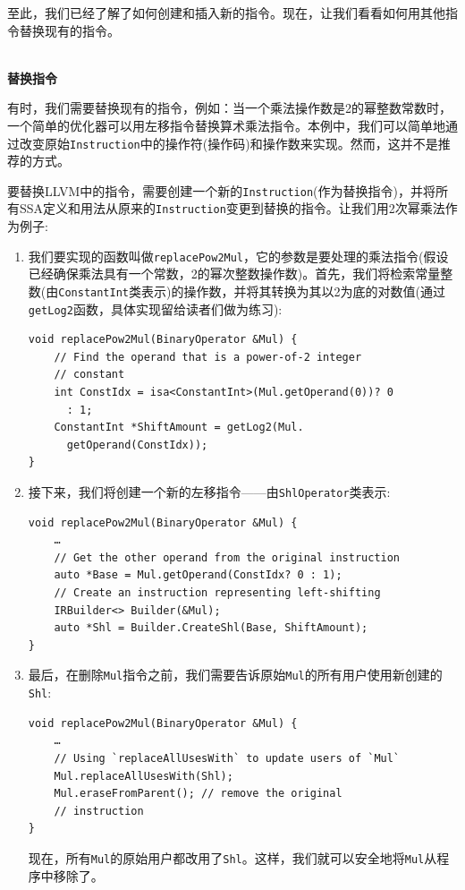 至此，我们已经了解了如何创建和插入新的指令。现在，让我们看看如何用其他指令替换现有的指令。

\hspace*{\fill} \\ %
\noindent
\textbf{替换指令}

有时，我们需要替换现有的指令，例如：当一个乘法操作数是2的幂整数常数时，一个简单的优化器可以用左移指令替换算术乘法指令。本例中，我们可以简单地通过改变原始\texttt{Instruction}中的操作符(操作码)和操作数来实现。然而，这并不是推荐的方式。

要替换LLVM中的指令，需要创建一个新的\texttt{Instruction}(作为替换指令)，并将所有SSA定义和用法从原来的\texttt{Instruction}变更到替换的指令。让我们用2次幂乘法作为例子:

\begin{enumerate}
\item 我们要实现的函数叫做\texttt{replacePow2Mul}，它的参数是要处理的乘法指令(假设已经确保乘法具有一个常数，2的幂次整数操作数)。首先，我们将检索常量整数(由\texttt{ConstantInt}类表示)的操作数，并将其转换为其以2为底的对数值(通过\texttt{getLog2}函数，具体实现留给读者们做为练习):

\begin{lstlisting}[style=styleCXX]
void replacePow2Mul(BinaryOperator &Mul) {
	// Find the operand that is a power-of-2 integer
	// constant
	int ConstIdx = isa<ConstantInt>(Mul.getOperand(0))? 0
	  : 1;
	ConstantInt *ShiftAmount = getLog2(Mul.
	  getOperand(ConstIdx));
}
\end{lstlisting}

\item 接下来，我们将创建一个新的左移指令——由\texttt{ShlOperator}类表示:

\begin{lstlisting}[style=styleCXX]
void replacePow2Mul(BinaryOperator &Mul) {
	…
	// Get the other operand from the original instruction
	auto *Base = Mul.getOperand(ConstIdx? 0 : 1);
	// Create an instruction representing left-shifting
	IRBuilder<> Builder(&Mul);
	auto *Shl = Builder.CreateShl(Base, ShiftAmount);
}
\end{lstlisting}

\item 最后，在删除\texttt{Mul}指令之前，我们需要告诉原始\texttt{Mul}的所有用户使用新创建的\texttt{Shl}:

\begin{lstlisting}[style=styleCXX]
void replacePow2Mul(BinaryOperator &Mul) {
	…
	// Using `replaceAllUsesWith` to update users of `Mul`
	Mul.replaceAllUsesWith(Shl);
	Mul.eraseFromParent(); // remove the original
	// instruction
}
\end{lstlisting}

现在，所有\texttt{Mul}的原始用户都改用了\texttt{Shl}。这样，我们就可以安全地将\texttt{Mul}从程序中移除了。

\end{enumerate}

